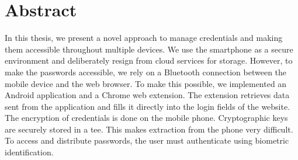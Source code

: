 
\section*{Abstract} \label{cha:abstract}
In this thesis, we present a novel approach to manage credentials and making them accessible throughout multiple devices. We use the smartphone as a secure environment and deliberately resign from cloud services for storage. However, to make the passwords accessible, we rely on a Bluetooth connection between the mobile device and the web browser. To make this possible, we implemented an Android application and a Chrome web extension. The extension retrieves data sent from the application and fills it directly into the login fields of the website. \\
The encryption of credentials is done on the mobile phone. Cryptographic keys are securely stored in a \gls{tee}. This makes extraction from the phone very difficult. To access and distribute passwords, the user must authenticate using biometric identification.

